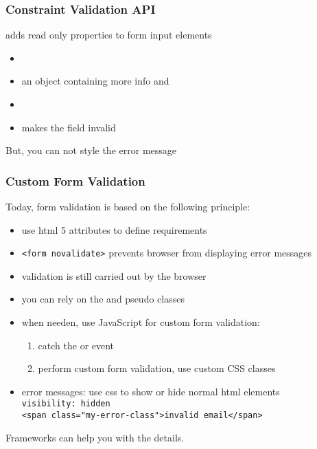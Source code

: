 \begin{frame}[fragile] \frametitle{Constraint Validation API}
adds read only properties to form input elements
\begin{itemize}
  \item {}
  \item {} an object containing more info  and 
  \item {}
  \item {} makes the field invalid
\end{itemize}
\vspace{5mm}
But, you can not style the error message
\end{frame}

\begin{frame}[fragile] \frametitle{Custom Form Validation}
Today, form validation is based on the following principle:
\begin{itemize}
  \item use html 5 attributes to define requirements
  \item \lstinline[style=htmlcssjs]{<form novalidate>} prevents browser from displaying error messages
  \item validation is still carried out by the browser
  \item you can rely on the  and  pseudo classes
  \item when needen, use JavaScript for custom form validation:
  \begin{enumerate}
    \item catch the  or  event
    \item perform custom form validation, use custom CSS classes
  \end{enumerate}
  \item error messages: use css to show or hide normal html elements
          \\ \lstinline[style=htmlcssjs]{visibility: hidden}
          \\ \lstinline[style=htmlcssjs]{<span class="my-error-class">invalid email</span>}
\end{itemize}
\vspace{5mm}
Frameworks can help you with the details.
\end{frame}

